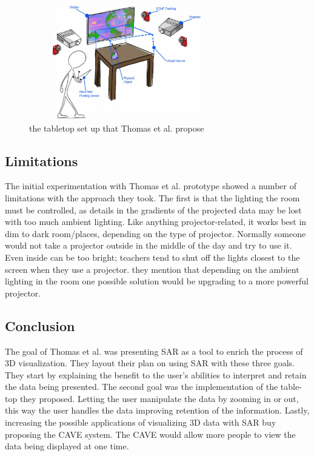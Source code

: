 \documentclass{sig-alternate}
\begin{document}
\begin{figure}
	\includegraphics[width=8.5cm, height=5cm]{Tabletop}
	\caption{the tabletop set up that Thomas et al. propose \cite{3D}}
	\label{fig:Tabletop}
\end{figure}

\subsection{Limitations}
\label{sec:Limitations}
The initial experimentation with Thomas et al. \cite{3D} prototype showed a number of limitations with the approach they took. The first is that the lighting the room must be controlled, as details in the gradients of the projected data may be lost with too much ambient lighting. Like anything projector-related, it works best in dim to dark room/places, depending on the type of projector. Normally someone would not take a projector outside in the middle of the day and try to use it. Even inside can be too bright; teachers tend to shut off the lights closest to the screen when they use a projector. they mention that depending on the ambient lighting in the room one possible solution would be upgrading to a more powerful projector.

\subsection{Conclusion}
\label{sec:Conclusion}
The goal of Thomas et al. \cite{3D} was presenting SAR as a tool to enrich the process of 3D visualization. They layout their plan on using SAR with these three goals. They start by explaining the benefit to the user's abilities to interpret and retain the data being presented. The second goal was the implementation of the table-top they proposed. Letting the user manipulate the data by zooming in or out, this way the user handles the data improving retention of the information. Lastly, increasing the possible applications of visualizing 3D data with SAR buy proposing the CAVE system. The CAVE would allow more people to view the data being displayed at one time.
\end{document}
